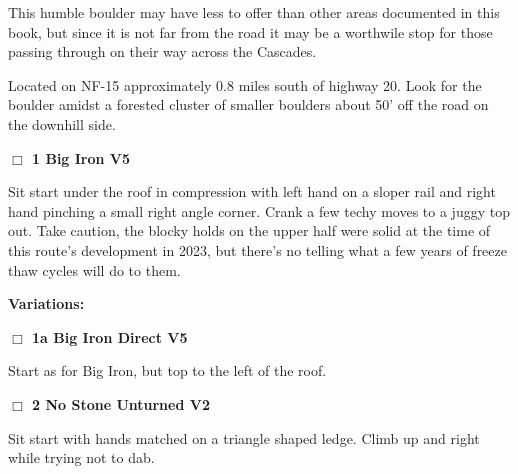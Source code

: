 \begin{multicols}{2}
This humble boulder may have less to offer than other areas documented in this book, but since it is not far from the road it may be a worthwile stop for those passing through on their way across the Cascades.

Located on NF-15 approximately 0.8 miles south of highway 20. Look for the boulder amidst a forested cluster of smaller boulders about 50' off the road on the downhill side.\\



\needspace{2em}
\label{rt:Big Iron}
\colorbox{RoyalBlue!20}{
\parbox{0.95\linewidth}{
\hspace{-1ex}\textbf{$\Box$
1 Big Iron V5  
}}}
\begin{adjustwidth}{1.3em}{}			

Sit start under the roof in compression with left hand on a sloper rail and right hand pinching a small right angle corner. Crank a few techy moves to a juggy top out. Take caution, the blocky holds on the upper half were solid at the time of this route's development in 2023, but there's no telling what a few years of freeze thaw cycles will do to them.
\end{adjustwidth}


\begin{adjustwidth}{0.5cm}{}				
\needspace{4em}
\textbf{Variations:} \newline

\needspace{2em}
\label{vr:Big Iron Direct}
\colorbox{RoyalBlue!20}{
\parbox{0.95\linewidth}{
\hspace{-1ex}\textbf{$\Box$
1a Big Iron Direct V5  
}}}
\begin{adjustwidth}{1.3em}{}			

Start as for Big Iron, but top to the left of the roof.
\end{adjustwidth}



\end{adjustwidth}


\needspace{2em}
\label{rt:No Stone Unturned}
\colorbox{green!20}{
\parbox{0.95\linewidth}{
\hspace{-1ex}\textbf{$\Box$
2 No Stone Unturned V2  
}}}
\begin{adjustwidth}{1.3em}{}			

Sit start with hands matched on a triangle shaped ledge. Climb up and right while trying not to dab.
\end{adjustwidth}




\end{multicols}
